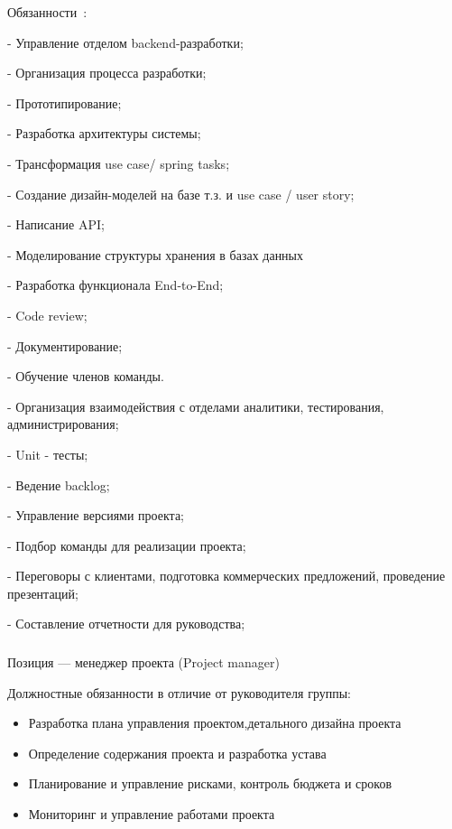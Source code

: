 \documentclass{../industrial-development}
\begin{document}
Обязанности~\cite{rab}:

- Управление отделом backend-разработки;

- Организация процесса разработки;

- Прототипирование;

- Разработка архитектуры системы;

- Трансформация use case/ spring tasks;

- Создание дизайн-моделей на базе т.з. и use case / user story;

- Написание API;

- Моделирование структуры хранения в базах данных

- Разработка функционала End-to-End;

- Code review;

- Документирование;

- Обучение членов команды.

- Организация взаимодействия с отделами аналитики, тестирования, администрирования;

- Unit - тесты;

- Ведение backlog;

- Управление версиями проекта;

- Подбор команды для реализации проекта;

- Переговоры с клиентами, подготовка коммерческих предложений, проведение презентаций;

- Составление отчетности для руководства;

\begin{frame} \frametitle{}
 \begin{block}{}
  \alert{Позиция --- менеджер проекта (Project manager)}

Должностные обязанности в отличие от руководителя группы: 
  \end{block}
  \begin{itemize}
  \item Разработка плана управления проектом,детального дизайна проекта

  \item Определение содержания проекта и разработка устава

 \item Планирование и управление рисками, контроль бюджета и сроков

  \item Мониторинг и управление работами проекта
  \end{itemize}
\end{frame}
\end{document}
